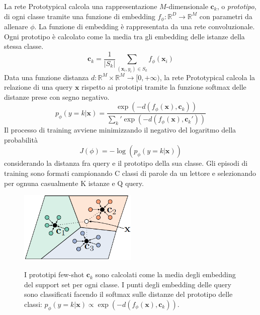 \documentclass[12pt,a4paper,titlepage]{article}
\begin{document}
La rete Prototypical calcola una rappresentazione $M$-dimensionale $\mathbf{c}_k$, o \emph{prototipo}, di ogni classe tramite una funzione di embedding $f_\phi : \mathbb{R}^D \rightarrow \mathbb{R}^M$ con parametri da allenare $\phi$. La funzione di embedding è rappresentata da una rete convoluzionale. Ogni prototipo è calcolato come la media tra gli embedding delle istanze della stessa classe.
\begin{equation}
	\mathbf{c}_k=\frac{1}{|S_k|}\sum_{(\mathbf{x}_i,y_i)\in S_k}f_\phi (\mathbf{x}_i)
\end{equation}
Data una funzione distanza $d: \mathbb{R}^M \times \mathbb{R}^M \rightarrow [0, +\infty )$, la rete Prototypical calcola la relazione di una query $\mathbf{x}$ rispetto ai prototipi tramite la funzione softmax delle distanze prese con segno negativo.
\begin{equation}\label{eq:softmax}
p_\phi(y=k|\mathbf{x})=\dfrac{\exp(-d(f_\phi(\mathbf{x}),\mathbf{c}_k))}{\sum_k' \exp(-d(f_\phi(\mathbf{x}),\mathbf{c}_k'))}
\end{equation}
Il processo di training avviene minimizzando il negativo del logaritmo della probabilità
\begin{equation}\label{eq:loss_proto}
	J(\phi)=-\log\left(p_\phi(y=k|\mathbf{x})\right)
\end{equation}
considerando la distanza fra query e il prototipo della sua classe.
Gli episodi di training sono formati campionando C classi di parole da un lettore e selezionando per ognuna casualmente K istanze e Q query.

\begin{figure}[h]
	\centering
	{\includegraphics[width=0.5\textwidth]{Immagini/proto_few_shot}}
	\label{fig:proto_few_zero_shot}	
	\caption{I prototipi few-shot $\mathbf{c}_k$ sono calcolati come la media degli embedding del support set per ogni classe. I punti degli embedding delle query sono classificati facendo il softmax sulle distanze del prototipo delle classi: $p_\phi(y = k|\mathbf{x}) \propto \exp \left(-d(f_\phi(\mathbf{x}),\mathbf{c}_k) \right)$.~\cite{snell:prototypical}}
\end{figure}
\clearpage
\end{document}
